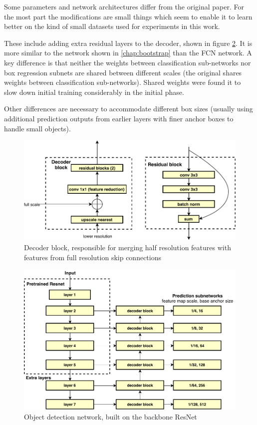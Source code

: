 Some parameters and network architectures differ from the original paper. For the most part the modifications are small things which seem to enable it to learn better on the kind of small datasets used for experiments in this work. 

These include adding extra residual layers to the decoder, shown in figure \ref{fig:detection_network}. It is more similar to the network shown in  \ref{chap:bootstrap} than the \gls{FCN} network. A key difference is that neither the weights between classification sub-networks nor box regression subnets are shared between different scales  (the original shares weights between classification sub-networks). Shared weights were found it to slow down initial training considerably in the initial phase. 

Other differences are necessary to accommodate different box sizes (usually using additional prediction outputs from earlier layers with finer anchor boxes to handle small objects).

\begin{figure}[h]
  \centering
  \includegraphics[width=1.0\linewidth]{figures/annotation/decoder_block.pdf}
  \caption{Decoder block, responsible for merging half resolution features with features from full resolution skip connections }  
  \label{fig:decoder_block}
\end{figure}


\begin{figure}[h]
  \centering
  \includegraphics[width=1.0\linewidth]{figures/annotation/detection_network.pdf}
  \caption{Object detection network, built on the backbone ResNet }  
  \label{fig:detection_network}
\end{figure}

